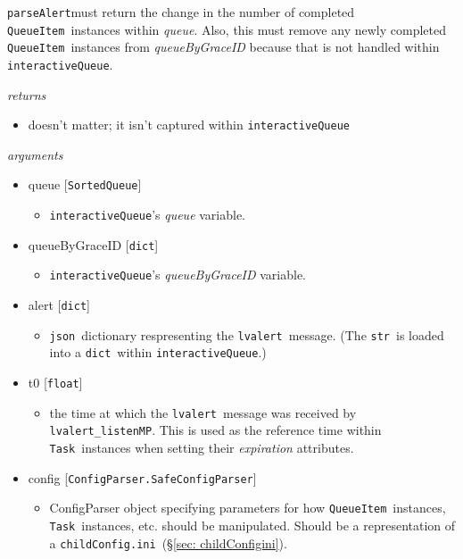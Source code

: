 \documentclass{article}
\newcommand{\alert}{\texttt{lvalert}}
\newcommand{\lvalertListenMP}{\texttt{lvalert\_listenMP}}
\newcommand{\interactiveQueue}{\texttt{interactiveQueue}}
\newcommand{\parseAlert}{\texttt{parseAlert}}
\newcommand{\SortedQueue}{\texttt{SortedQueue}}
\newcommand{\QueueItem}{\texttt{QueueItem}}
\newcommand{\Task}{\texttt{Task}}
\newcommand{\childConfigini}{\texttt{childConfig.ini}}
\newcommand{\pythonfloat}{\texttt{float}}
\newcommand{\pythonstr}{\texttt{str}}
\newcommand{\pythondict}{\texttt{dict}}
\newcommand{\json}{\texttt{json}}
\begin{document}
\parseAlert must return the change in the number of completed \QueueItem~instances within \textit{queue}.
Also, this must remove any newly completed \QueueItem~instances from \textit{queueByGraceID} because that is not handled within \interactiveQueue.

\vspace{0.5cm}
\noindent
\textit{returns}

\begin{itemize}
    \item{doesn't matter; it isn't captured within \interactiveQueue}
\end{itemize}

\noindent
\textit{arguments}

\begin{itemize} 
    \item{queue [\SortedQueue]
        \begin{itemize}
            \item{\interactiveQueue's \textit{queue} variable.}
        \end{itemize}
         }
    \item{queueByGraceID [\pythondict]
        \begin{itemize}
            \item{\interactiveQueue's \textit{queueByGraceID} variable.}
        \end{itemize}
         }
    \item{alert [\pythondict]
        \begin{itemize}
            \item{\json~dictionary respresenting the \alert~message. (The \pythonstr~is loaded into a \pythondict~within \interactiveQueue.)}
        \end{itemize}
         }
    \item{t0 [\pythonfloat]
        \begin{itemize}
            \item{the time at which the \alert~message was received by \lvalertListenMP. This is used as the reference time within \Task~instances when setting their \textit{expiration} attributes.}
        \end{itemize}
         }
    \item{config [\texttt{ConfigParser.SafeConfigParser}]
        \begin{itemize}
            \item{ConfigParser object specifying parameters for how \QueueItem~instances, \Task~instances, etc. should be manipulated. Should be a representation of a \childConfigini~(\S\ref{sec: childConfigini}).}
        \end{itemize}
         }
\end{itemize}
\end{document}
